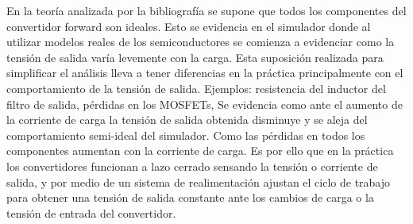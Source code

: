 En la teoría analizada por la bibliografía se supone que todos los componentes del convertidor forward son ideales. 
Esto se evidencia en el simulador donde al utilizar modelos reales de los semiconductores se comienza a evidenciar como la tensión de salida varía levemente con la carga. 
Esta suposición realizada para simplificar el análisis lleva a tener diferencias en la práctica principalmente con el comportamiento de la tensión de salida. 
Ejemplos: resistencia del inductor del filtro de salida, pérdidas en los MOSFETs,
Se evidencia como ante el aumento de la corriente de carga la tensión de salida obtenida disminuye y se aleja del comportamiento semi-ideal del simulador. 
Como las pérdidas en todos los componentes aumentan con la corriente de carga. 
Es por ello que en la práctica los convertidores funcionan a lazo cerrado sensando la tensión o corriente de salida, y por medio de un sistema de realimentación ajustan el ciclo de trabajo para obtener una tensión de salida constante ante los cambios de carga o la tensión de entrada del convertidor.